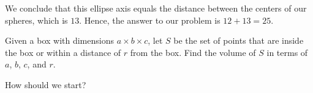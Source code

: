 













We conclude that this ellipse axis equals the distance between the centers of our spheres, which is $13.$ Hence, the answer to our problem is $12+13 = 25.$

\begin{example}
Given a box with dimensions $a \times b \times c$, let $S$ be the set of points that are inside the box or within a distance of $r$ from the box. Find the volume of $S$ in terms of $a$, $b$, $c$, and $r.$    
\end{example}

How should we start?





